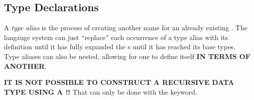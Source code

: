 \subsection{Type Declarations}\label{subsec:Type_Declarations}
\begin{definition}\label{def:Type_Alias}
  A \emph{type alias} is the process of creating another name for an already existing .
  The langauge system can just ``replace'' each occurrence of a type alias with its definition until it has fully expanded the s until it has reached its base types.
  Type aliases can also be nested, allowing for one to define itself \textbf{IN TERMS OF ANOTHER}.

  \begin{remark}\label{rmk:Recursive_Type_Alias}
    \textbf{IT IS NOT POSSIBLE TO CONSTRUCT A RECURSIVE DATA TYPE USING A !!}
    That can only be done with the  keyword.
  \end{remark}
\end{definition}


